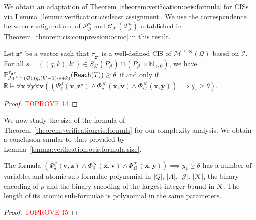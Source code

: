 \documentclass[a4paper,UKenglish,cleveref,autoref,thm-restate,colorlinks]{lipics-v2021}
\newcommand{\IR}{\mathbb{R}}
\newcommand{\IN}{\mathbb{N}}
\newcommand{\INpos}{\IN_{>0}}
\newcommand{\mdp}{\mathcal{M}}
\newcommand{\mdpStateSpace}{S}
\newcommand{\ocmdp}{\mathcal{Q}}
\newcommand{\ocmdpFin}[2]{\mdp^{\leq #2}(#1)}
\newcommand{\ocStateSpace}{Q}
\newcommand{\ocState}{q}
\newcommand{\ocCount}{k}
\newcommand{\ocCountB}{k'}
\newcommand{\ocConfig}{s}
\newcommand{\ocActionSpace}{A}
\newcommand{\ocTrans}{\delta}
\newcommand{\period}{\rho}
\newcommand{\mchain}{\mathcal{C}}
\newcommand{\ocChain}{\mathcal{P}}
\newcommand{\intPart}{\mathcal{I}}
\newcommand{\intPartB}{\mathcal{J}}
\newcommand{\intPartC}{\mathcal{K}}
\newcommand{\cisChainStrat}[1]{\ocChain^{#1}_{\intPartB}}
\newcommand{\cisChainStateSpace}{P_{\intPartB}}
\newcommand{\cisChainStateSpaceStar}{P_{\intPartB}^{\top}}
\newcommand{\compressCisStateSpace}{\mdpStateSpace_{\intPartC}({\cisChainStateSpace})}
\newcommand{\cisConfig}{\bar{\ocConfig}}
\newcommand{\varTrans}{x}
\newcommand{\varTransTuple}{\mathbf{\varTrans}}
\newcommand{\varObj}{y}
\newcommand{\varObjTuple}{\mathbf{\varObj}}
\newcommand{\varStrat}{z}
\newcommand{\varStratTuple}{\mathbf{\varStrat}}
\newcommand{\solStratTuple}{\mathbf{\varStrat}^{\star}}
\newcommand{\varCis}{v}
\newcommand{\varCisTuple}{\mathbf{\varCis}}
\newcommand{\cisChainSymbolic}{\cisChainStrat{\varStratTuple}}
\newcommand{\compressCisSymbolic}{\mchain_{\intPartC}({\cisChainSymbolic})}
\newcommand{\formulaTransBase}{\Phi_{\ocTrans}}
\newcommand{\formulaObjBase}{\Phi_{\objective}}
\newcommand{\formulaCisBase}{\Psi_{\ocTrans}}
\newcommand{\formulaCis}{\formulaCisBase^\intPartB}
\newcommand{\formulaCisTrans}{\formulaTransBase^\intPartC}
\newcommand{\formulaCisObj}{\formulaObjBase^\intPartC}
\newcommand{\objective}{\Omega}
\newcommand{\reach}[1]{\mathsf{Reach}(#1)}
\newcommand{\target}{T}
\newcommand{\thresProba}{\theta}
\newcommand{\stratBGeneric}[1]{{\tau_{#1}}}
\newcommand{\stratB}{\stratBGeneric{}}
\begin{document}
We obtain an adaptation of Theorem~\ref{theorem:verification:oeis:formula} for CISs via Lemma~\ref{lemma:verification:cis:least assignment}.
We use the correspondence between configurations of $\cisChainSymbolic$ and $\compressCisSymbolic$ established in Theorem~\ref{theorem:cis:compression:ocmc} in this result.

\begin{theorem}\label{theorem:verification:cis:formula}
  Let $\solStratTuple$ be a vector such that $\stratB_{\solStratTuple}$ is a well-defined CIS of $\ocmdpFin{\ocmdp}{\infty}$ based on $\intPart$.
  For all $\cisConfig = ((\ocState, \ocCount), \ocCountB)\in\compressCisStateSpace\cap(\cisChainStateSpaceStar\times\INpos)$, we have $\probaGverb{\ocmdpFin{\ocmdp}{\infty}}{(\ocState, (\ocCountB-1)\cdot\period+\ocCount)}{\stratB_{\solStratTuple}}(\reach{\bar{\target}})\geq\thresProba$ if and only if $\IR\models\forall\varTransTuple\,\forall\varObjTuple\forall\varCisTuple ((\formulaCis(\varCisTuple, \solStratTuple)\land\formulaCisTrans(\varTransTuple,\varCisTuple)\land\formulaCisObj(\varTransTuple, \varObjTuple))\implies \varObj_{\cisConfig}\geq\thresProba)$.
\end{theorem}
\begin{proof}\textcolor{red}{TOPROVE 14}\end{proof}

We now study the size of the formula of Theorem~\ref{theorem:verification:cis:formula} for our complexity analysis.
We obtain a conclusion similar to that provided by Lemma~\ref{lemma:verification:oeis:formula:size}.
\begin{lemma}\label{lemma:verification:cis:formula:size}
  The formula $(\formulaCis(\varCisTuple, \varStratTuple)\land\formulaCisTrans(\varTransTuple,\varCisTuple)\land\formulaCisObj(\varTransTuple, \varObjTuple))\implies \varObj_{\cisConfig}\geq\thresProba$ has a number of variables and atomic sub-formulae polynomial in $|\ocStateSpace|$, $|\ocActionSpace|$, $|\intPartB|$, $|\intPartC|$, the binary encoding of $\period$ and the binary encoding of the largest integer bound in $\intPartC$.
    The length of its atomic sub-formulae is polynomial in the same parameters.
\end{lemma}
\begin{proof}\textcolor{red}{TOPROVE 15}\end{proof}
\end{document}
